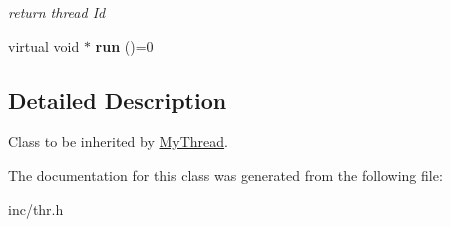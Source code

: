 \begin{DoxyCompactItemize}
\begin{DoxyCompactList}\small\item\em return thread Id \end{DoxyCompactList}\item 
\hypertarget{class_thread_a0ceaa28981eacf1051845542053d82b6}{virtual void $\ast$ {\bfseries run} ()=0}\label{class_thread_a0ceaa28981eacf1051845542053d82b6}

\end{DoxyCompactItemize}


\subsection{Detailed Description}
Class to be inherited by \hyperlink{class_my_thread}{My\-Thread}. 

The documentation for this class was generated from the following file\-:\begin{DoxyCompactItemize}
\item 
inc/thr.\-h\end{DoxyCompactItemize}
